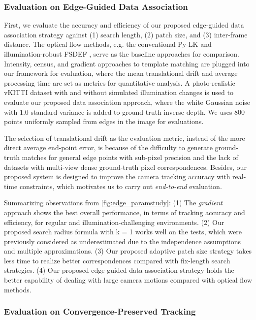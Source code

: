 \subsubsection{Evaluation on Edge-Guided Data Association }
First, we evaluate the accuracy and efficiency of our proposed edge-guided data association strategy against (1) search length, (2) patch size, and (3) inter-frame distance. 
The optical flow methods, e.g. the conventional Py-LK  \cite{baker2004lucas} and illumination-robust FSDEF \cite{garrigues2017fast}, serve as the baseline approaches for comparison. 
Intensity, census, and gradient approaches to template matching are plugged into our framework for evaluation, where the mean translational drift and average processing time are set as metrics for quantitative analysis. 
A photo-realistic vKITTI \cite{gaidon2016virtual} dataset with and without simulated illumination changes is used to evaluate our proposed data association approach, where the white Gaussian noise with $1.0$ standard variance is added to ground truth inverse depth. 
We uses 800 points uniformly sampled from edges in the image for evaluations.

The selection of translational drift as the evaluation metric, instead of the more direct average end-point error, is because of the difficulty to generate ground-truth matches for general edge points with sub-pixel precision and the lack of datasets with multi-view dense ground-truth pixel correspondences. 
Besides, our proposed system is designed to improve the camera tracking accuracy with real-time constraints, which motivates us to carry out {\em end-to-end} evaluation.

Summarizing observations from \ref{fig:edge_paramstudy}: 
(1) The {\em gradient} approach shows the best overall performance, in terms
of tracking accuracy and efficiency, for regular and illumination-challenging environments. 
(2) Our proposed search radius formula with k = 1 works well on the tests, which were previously considered as underestimated due to the independence assumptions and multiple approximations. 
(3) Our proposed adaptive patch size strategy takes less time to realize better correspondences compared with fix-length search strategies. 
(4) Our proposed edge-guided data association strategy holds the better capability of dealing with large camera motions compared with optical flow methods.  

\subsubsection{Evaluation on Convergence-Preserved Tracking}


